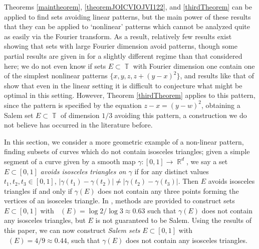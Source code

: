 \documentclass[dvipsnames,letterpaper,12pt]{article}
\numberwithin{equation}{section}
\DeclareMathOperator{\hausdim}{\dim_{\mathbb{H}}}
\DeclareMathOperator{\fordim}{\dim_{\mathbb{F}}}
\DeclareMathOperator{\RR}{\mathbb{R}}
\DeclareMathOperator{\TT}{\mathbb{T}}
\numberwithin{theorem}{section}
\begin{document}
Theorems \ref{maintheorem}, \ref{theoremJOICVIOJVI122}, and \ref{thirdTheorem} can be applied to find sets avoiding linear patterns, but the main power of these results that they can be applied to `nonlinear' patterns which cannot be analyzed quite as easily via the Fourier transform. As a result, relatively few results exist showing that sets with large Fourier dimension avoid patterns, though some partial results are given in \cite{HenriotLabaPramanik} for a slightly different regime than that considered here; we do not even know if sets $E \subset \TT$ with Fourier dimension one contain one of the simplest nonlinear patterns $\{ x, y, z, z + (y - x)^2 \}$, and results like that of \cite{Schmerkin} show that even in the linear setting it is difficult to conjecture what might be optimal in this setting. However, Theorem \ref{thirdTheorem} applies to this pattern, since the pattern is specified by the equation $z - x = (y - w)^2$, obtaining a Salem set $E \subset \TT$ of dimension $1/3$ avoiding this pattern, a construction we do not believe has occurred in the literature before.

In this section, we consider a more geometric example of a non-linear pattern, finding subsets of curves which do not contain isosceles triangles; given a simple segment of a curve given by a smooth map $\gamma : [0,1] \to \RR^d$, we say a set $E \subset [0,1]$ \emph{avoids isosceles triangles on $\gamma$} if for any distinct values $t_1,t_2,t_3 \in [0,1]$, $|\gamma(t_1) - \gamma(t_2)| \neq |\gamma(t_2) - \gamma(t_3)|$. Then $E$ avoids isosceles triangles if and only if $\gamma(E)$ does not contain any three points forming the vertices of an  isosceles triangle. In \cite{PramanikFraser}, methods are provided to construct sets $E \subset [0,1]$ with $\hausdim(E) = \log 2 / \log 3 \approx 0.63$ such that $\gamma(E)$ does not contain any isosceles triangles, but $E$ is not guaranteed to be Salem. Using the results of this paper, we can now construct \emph{Salem sets} $E \subset [0,1]$ with $\fordim(E) = 4/9 \approx 0.44$, such that $\gamma(E)$ does not contain any isosceles triangles.
\end{document}
